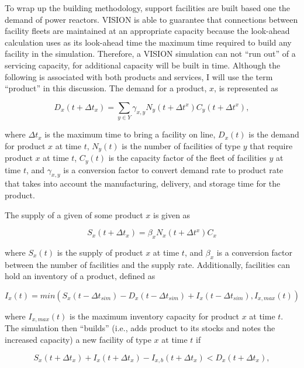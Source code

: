 To wrap up the building methodology, support facilities are built based one the
demand of power reactors. VISION is able to guarantee that connections between
facility fleets are maintained at an appropriate capacity because the look-ahead
calculation uses as its look-ahead time the maximum time required to build any
facility in the simulation. Therefore, a VISION simulation can not ``run out''
of a servicing capacity, for additional capacity will be built in time. Although
the following is associated with both products and services, I will use the term
``product'' in this discussion. The demand for a product, $x$, is
represented as

\begin{equation*}
D_x(t + \Delta t_x) = \sum_{y \in Y} \gamma_{x,y} N_y(t + \Delta t^x) C_y(t + \Delta t^x),
\end{equation*}

where $\Delta t_x$ is the maximum time to bring a facility on line, $D_x(t)$ is
the demand for product $x$ at time $t$, $N_y(t)$ is the number of
facilities of type $y$ that require product $x$ at time $t$, $C_y(t)$ is
the capacity factor of the fleet of facilities $y$ at time $t$, and
$\gamma_{x,y}$ is a conversion factor to convert demand rate to product
rate that takes into account the manufacturing, delivery, and storage time for
the product.

The supply of a given of some product $x$ is given as

\begin{equation*}
S_x(t + \Delta t_x) = \beta_x N_x(t + \Delta t^x) C_x
\end{equation*}

where $S_x(t)$ is the supply of product $x$ at time $t$, and $\beta_x$ is a
conversion factor between the number of facilities and the supply
rate. Additionally, facilities can hold an inventory of a product, defined as

\begin{equation*}
I_x(t) = min \left( S_x(t-\Delta t_{sim}) - D_x(t-\Delta t_{sim}) 
       + I_x(t-\Delta t_{sim}), I_{x,max}(t) \right)
\end{equation*}

where $I_{x,max}(t)$ is the maximum inventory capacity for product $x$ at time
$t$. The simulation then ``builds'' (i.e., adds product to its stocks and notes
the increased capacity) a new facility of type $x$ at time $t$ if 

\begin{equation*}
S_x(t + \Delta t_x) + I_x(t + \Delta t_x) - 
      I_{x,b}(t + \Delta t_x) < D_x(t + \Delta t_x),
\end{equation*}

